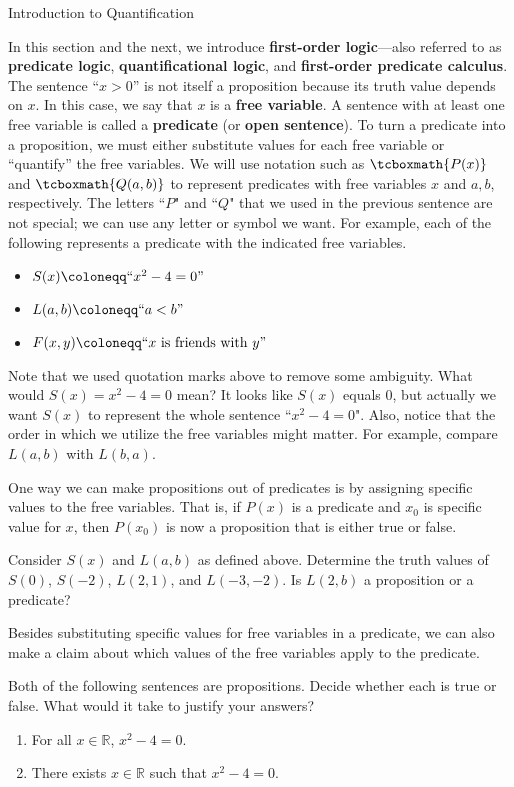 \begin{section}{Introduction to Quantification}

In this section and the next, we introduce \textbf{first-order logic}---also referred to as \textbf{predicate logic}, \textbf{quantificational logic}, and \textbf{first-order predicate calculus}. The sentence ``$x>0$'' is not itself a proposition because its truth value depends on $x$.  In this case, we say that $x$ is a \textbf{free variable}. A sentence with at least one free variable is called a \textbf{predicate} (or \textbf{open sentence}). To turn a predicate into a proposition, we must either substitute values for each free variable or ``quantify'' the free variables. We will use notation such as $\tcboxmath{P(x)}$ and $\tcboxmath{Q(a,b)}$ to represent predicates with free variables $x$ and $a,b$, respectively. The letters ``$P$" and ``$Q$" that we used in the previous sentence are not special; we can use any letter or symbol we want. For example, each of the following represents a predicate with the indicated free variables.
\begin{itemize}
\item $S(x)\coloneqq ``x^2-4=0"$
\item $L(a,b)\coloneqq ``a<b"$
\item $F(x,y)\coloneqq ``x \mbox{ is friends with } y"$
\end{itemize}
Note that we used quotation marks above to remove some ambiguity.  What would $S(x)=x^2-4=0$ mean?  It looks like $S(x)$ equals 0, but actually we want $S(x)$ to represent the whole sentence ``$x^2-4=0$". Also, notice that the order in which we utilize the free variables might matter.  For example, compare $L(a,b)$ with $L(b,a)$.

One way we can make propositions out of predicates is by assigning specific values to the free variables.  That is, if $P(x)$ is a predicate and $x_0$ is specific value for $x$, then $P(x_0)$ is now a proposition that is either true or false.

\begin{problem}
Consider $S(x)$ and $L(a,b)$ as defined above. Determine the truth values of $S(0)$, $S(-2)$, $L(2,1)$, and $L(-3,-2)$. Is $L(2,b)$ a proposition or a predicate?
\end{problem}

Besides substituting specific values for free variables in a predicate, we can also make a claim about which values of the free variables apply to the predicate.

\begin{problem}\label{ex:quantified predicates}
Both of the following sentences are propositions. Decide whether each is true or false. What would it take to justify your answers?
\begin{enumerate}[label=\textrm{(\alph*)}]
\item For all $x\in\mathbb{R}$, $x^2-4=0$.
\item There exists $x\in\mathbb{R}$ such that $x^2-4=0$.
\end{enumerate}
\end{problem}


\end{section}
